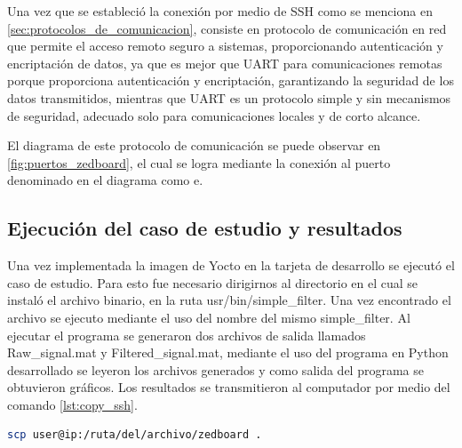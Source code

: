 Una vez que se estableció la conexión por medio de SSH como se menciona en \ref{sec:protocolos_de_comunicacion}, consiste en protocolo de comunicación en red que permite el acceso remoto seguro a sistemas, proporcionando autenticación y encriptación de datos, ya que es mejor que UART para comunicaciones remotas porque proporciona autenticación y encriptación, garantizando la seguridad de los datos transmitidos, mientras que UART es un protocolo simple y sin mecanismos de seguridad, adecuado solo para comunicaciones locales y de corto alcance. 

El diagrama de este protocolo de comunicación se puede observar en \ref{fig:puertos_zedboard}, el cual se logra mediante la conexión al puerto denominado en el diagrama como e.


\subsection{Ejecución del caso de estudio y resultados}

Una vez implementada la imagen de Yocto en la tarjeta de desarrollo se ejecutó el caso de estudio. Para esto fue necesario dirigirnos al directorio en el cual se instaló el archivo binario, en la ruta usr/bin/simple\_filter. Una vez encontrado el archivo se ejecuto mediante el uso del nombre del mismo simple\_filter. Al ejecutar el programa se generaron dos archivos de salida llamados Raw\_signal.mat y Filtered\_signal.mat, mediante el uso del programa en Python desarrollado se leyeron los archivos generados y como salida del programa se obtuvieron gráficos. Los resultados se transmitieron al computador por medio del comando \ref{lst:copy_ssh}.

\begin{lstlisting}[language=bash, caption={Copiar archivo por protocolo SSH, Linux}, label=lst:copy_ssh]
    scp user@ip:/ruta/del/archivo/zedboard .
\end{lstlisting}

